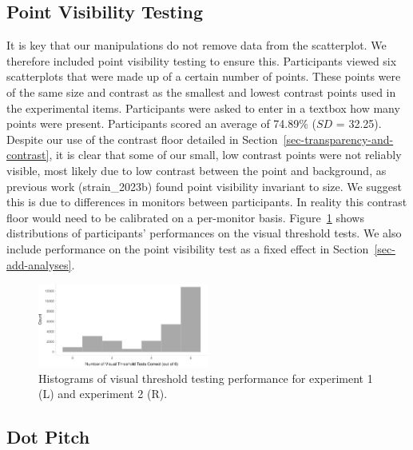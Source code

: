 \documentclass[manuscript, review, anonymous, screen]{acmart}
\begin{document}
\hypertarget{sec-VT}{%
\subsection{Point Visibility Testing}\label{sec-VT}}

It is key that our manipulations do not remove data from the
scatterplot. We therefore included point visibility testing to ensure
this. Participants viewed six scatterplots that were made up of a
certain number of points. These points were of the same size and
contrast as the smallest and lowest contrast points used in the
experimental items. Participants were asked to enter in a textbox how
many points were present. Participants scored an average of 74.89\%
(\(SD\) = 32.25). Despite our use of the contrast floor detailed in
Section~\ref{sec-transparency-and-contrast}, it is clear that some of
our small, low contrast points were not reliably visible, most likely
due to low contrast between the point and background, as previous work
(strain\_2023b) found point visibility invariant to size. We suggest
this is due to differences in monitors between participants. In reality
this contrast floor would need to be calibrated on a per-monitor basis.
Figure~\ref{fig-VT-hist} shows distributions of participants'
performances on the visual threshold tests. We also include performance
on the point visibility test as a fixed effect in
Section~\ref{sec-add-analyses}.

\begin{figure}

\includegraphics[width=0.5\textwidth,height=\textheight]{size_and_contrast_new_files/figure-pdf/fig-VT-hist-1.pdf} \hfill{}

\caption{\label{fig-VT-hist}Histograms of visual threshold testing
performance for experiment 1 (L) and experiment 2 (R).}

\end{figure}

\hypertarget{sec-dot-pitch}{%
\subsection{Dot Pitch}\label{sec-dot-pitch}}
\end{document}
